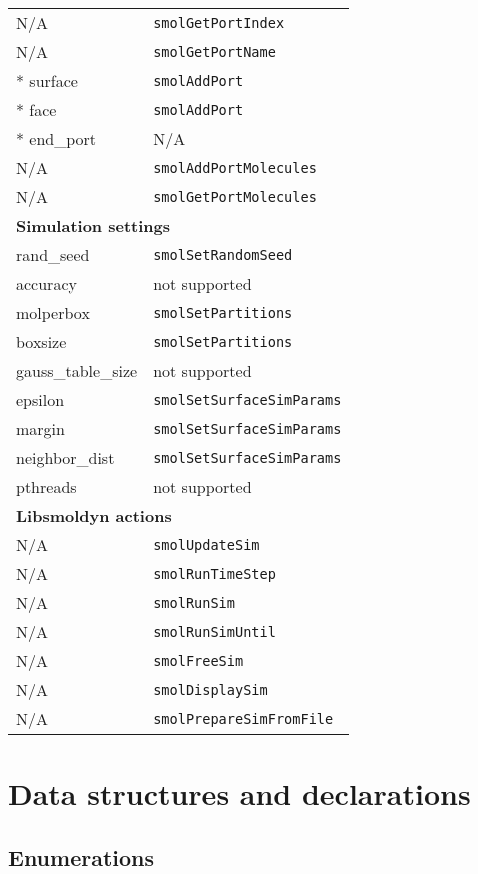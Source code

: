 \documentclass {book}
\begin{document}
\begin{longtable}[c]{ll}
N/A & \texttt{smolGetPortIndex}\\
N/A & \texttt{smolGetPortName}\\
{*} surface & \texttt{smolAddPort}\\
{*} face & \texttt{smolAddPort}\\
{*} end\_port & N/A\\
N/A & \texttt{smolAddPortMolecules}\\
N/A & \texttt{smolGetPortMolecules}\\
\hline
\multicolumn{2}{l}{\hspace{0.3in}\textbf{Simulation settings}}\\
\hline
rand\_seed & \texttt{smolSetRandomSeed}\\
accuracy & not supported\\
molperbox & \texttt{smolSetPartitions}\\
boxsize & \texttt{smolSetPartitions}\\
gauss\_table\_size & not supported\\
epsilon & \texttt{smolSetSurfaceSimParams}\\
margin & \texttt{smolSetSurfaceSimParams}\\
neighbor\_dist & \texttt{smolSetSurfaceSimParams}\\
pthreads & not supported\\
\hline
\multicolumn{2}{l}{\hspace{0.3in}\textbf{Libsmoldyn actions}}\\
\hline
N/A & \texttt{smolUpdateSim}\\
N/A & \texttt{smolRunTimeStep}\\
N/A & \texttt{smolRunSim}\\
N/A & \texttt{smolRunSimUntil}\\
N/A & \texttt{smolFreeSim}\\
N/A & \texttt{smolDisplaySim}\\
N/A & \texttt{smolPrepareSimFromFile}\\
\end{longtable}


\chapter{Data structures and declarations}

\section{Enumerations}
\end{document}
